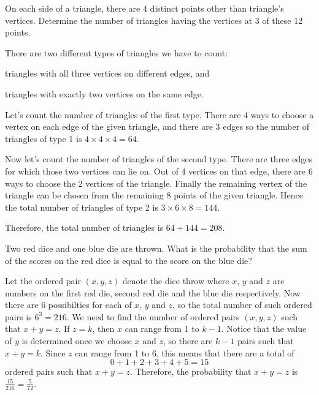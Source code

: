 \begin{question}
    On each side of a triangle, there are 4 distinct points other than
    triangle's vertices. Determine the number of triangles having the vertices
    at 3 of these 12 points.
\end{question}
\begin{solution}
    There are two different types of triangles we have to count: 
    \begin{enumerate*}[label=(\arabic*)]
        \item triangles with all three vertices on different edges, and

        \item triangles with exactly two vertices on the same edge.
    \end{enumerate*}

    Let's count the number of triangles of the first type. There are 4 ways to
    choose a vertex on each edge of the given triangle, and there are 3 edges
    so the number of triangles of type 1 is $4 \times 4 \times 4 = 64$.

    Now let's count the number of triangles of the second type. There are three
    edges for which those two vertices can lie on. Out of 4 vertices on that
    edge, there are 6 ways to choose the 2 vertices of the triangle. Finally
    the remaining vertex of the triangle can be chosen from the remaining 8
    points of the given triangle. Hence the total number of triangles of type
    2 is $3 \times 6 \times 8 = 144$. 
    
    Therefore, the total number of triangles is $64 + 144 = 208$. 
\end{solution}

\begin{question}
    Two red dice and one blue die are thrown. What is the probability that the
    sum of the scores on the red dice is equal to the score on the blue die? 
\end{question}
\begin{solution}
    Let the ordered pair $(x, y, z)$ denote the dice throw where $x$, $y$ and
    $z$ are numbers on the first red die, second red die and the blue die
    respectively. Now there are 6 possibilties for each of $x$, $y$ and $z$, so
    the total number of such ordered pairs is $6^3 = 216$. We need to find the
    number of ordered pairs $(x, y, z)$ such that $x + y = z$. If $z = k$, then
    $x$ can range from 1 to $k - 1$. Notice that the value of $y$ is determined
    once we choose $x$ and $z$, so there are $k - 1$ pairs such that $x + y =
    k$. Since $z$ can range from 1 to 6, this means that there are a total of
    \[ 0 + 1 + 2 + 3 + 4 + 5 = 15 \]
    ordered pairs such that $x + y = z$. Therefore, the probability that $x + y
    = z$ is $\frac{15}{216} = \frac{5}{72}$. 
\end{solution}

